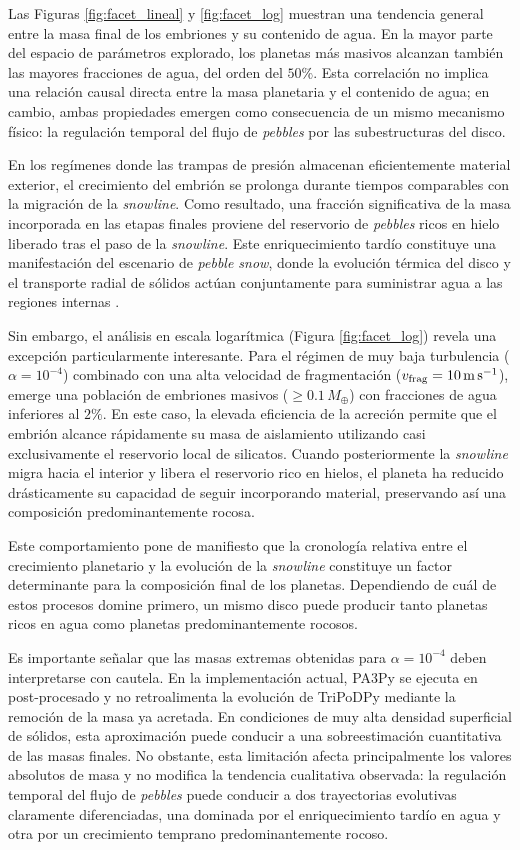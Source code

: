 Las Figuras \ref{fig:facet_lineal} y \ref{fig:facet_log} muestran una tendencia general entre la masa final de los embriones y su contenido de agua. En la mayor parte del espacio de parámetros explorado, los planetas más masivos alcanzan también las mayores fracciones de agua, del orden del $50\%$. Esta correlación no implica una relación causal directa entre la masa planetaria y el contenido de agua; en cambio, ambas propiedades emergen como consecuencia de un mismo mecanismo físico: la regulación temporal del flujo de \textit{pebbles} por las subestructuras del disco.

En los regímenes donde las trampas de presión almacenan eficientemente material exterior, el crecimiento del embrión se prolonga durante tiempos comparables con la migración de la \textit{snowline}. Como resultado, una fracción significativa de la masa incorporada en las etapas finales proviene del reservorio de \textit{pebbles} ricos en hielo liberado tras el paso de la \textit{snowline}. Este enriquecimiento tardío constituye una manifestación del escenario de \textit{pebble snow}, donde la evolución térmica del disco y el transporte radial de sólidos actúan conjuntamente para suministrar agua a las regiones internas \citep{Drazkowska2021}.

Sin embargo, el análisis en escala logarítmica (Figura \ref{fig:facet_log}) revela una excepción particularmente interesante. Para el régimen de muy baja turbulencia ($\alpha = 10^{-4}$) combinado con una alta velocidad de fragmentación ($v_{\rm frag}=10\,{\rm m\,s^{-1}}$), emerge una población de embriones masivos ($\ge0.1\,M_\oplus$) con fracciones de agua inferiores al $2\%$. En este caso, la elevada eficiencia de la acreción permite que el embrión alcance rápidamente su masa de aislamiento utilizando casi exclusivamente el reservorio local de silicatos. Cuando posteriormente la \textit{snowline} migra hacia el interior y libera el reservorio rico en hielos, el planeta ha reducido drásticamente su capacidad de seguir incorporando material, preservando así una composición predominantemente rocosa.

Este comportamiento pone de manifiesto que la cronología relativa entre el crecimiento planetario y la evolución de la \textit{snowline} constituye un factor determinante para la composición final de los planetas. Dependiendo de cuál de estos procesos domine primero, un mismo disco puede producir tanto planetas ricos en agua como planetas predominantemente rocosos.

Es importante señalar que las masas extremas obtenidas para $\alpha = 10^{-4}$ deben interpretarse con cautela. En la implementación actual, PA3Py se ejecuta en post-procesado y no retroalimenta la evolución de TriPoDPy mediante la remoción de la masa ya acretada. En condiciones de muy alta densidad superficial de sólidos, esta aproximación puede conducir a una sobreestimación cuantitativa de las masas finales. No obstante, esta limitación afecta principalmente los valores absolutos de masa y no modifica la tendencia cualitativa observada: la regulación temporal del flujo de \textit{pebbles} puede conducir a dos trayectorias evolutivas claramente diferenciadas, una dominada por el enriquecimiento tardío en agua y otra por un crecimiento temprano predominantemente rocoso.


